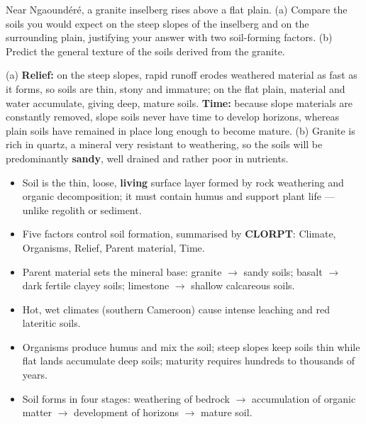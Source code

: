 \documentclass[11pt]{article}
\begin{document}
\begin{exercice}
Near Ngaoundéré, a granite inselberg rises above a flat plain. (a) Compare the soils you would expect on the steep slopes of the inselberg and on the surrounding plain, justifying your answer with two soil-forming factors. (b) Predict the general texture of the soils derived from the granite.
\end{exercice}

\begin{corrige}[Exercise 1]
(a) \textbf{Relief:} on the steep slopes, rapid runoff erodes weathered material as fast as it forms, so soils are thin, stony and immature; on the flat plain, material and water accumulate, giving deep, mature soils. \textbf{Time:} because slope materials are constantly removed, slope soils never have time to develop horizons, whereas plain soils have remained in place long enough to become mature. (b) Granite is rich in quartz, a mineral very resistant to weathering, so the soils will be predominantly \textbf{sandy}, well drained and rather poor in nutrients.
\end{corrige}

\begin{aretenir}
\begin{itemize}
\item Soil is the thin, loose, \textbf{living} surface layer formed by rock weathering and organic decomposition; it must contain humus and support plant life — unlike regolith or sediment.
\item Five factors control soil formation, summarised by \textbf{CLORPT}: Climate, Organisms, Relief, Parent material, Time.
\item Parent material sets the mineral base: granite $\rightarrow$ sandy soils; basalt $\rightarrow$ dark fertile clayey soils; limestone $\rightarrow$ shallow calcareous soils.
\item Hot, wet climates (southern Cameroon) cause intense leaching and red lateritic soils.
\item Organisms produce humus and mix the soil; steep slopes keep soils thin while flat lands accumulate deep soils; maturity requires hundreds to thousands of years.
\item Soil forms in four stages: weathering of bedrock $\rightarrow$ accumulation of organic matter $\rightarrow$ development of horizons $\rightarrow$ mature soil.
\end{itemize}
\end{aretenir}
\end{document}
